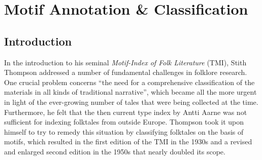
\chapter{Motif Annotation \& Classification}\label{ch:motif-classification}


\section{Introduction}

In the introduction to his seminal \emph{Motif-Index of Folk Literature} (TMI), Stith Thompson addressed a number of fundamental challenges in folklore research. One crucial problem concerns ``the need for a comprehensive classification of the materials in all kinds of traditional narrative''\autocite[8]{thompson:1955}, which became all the more urgent in light of the ever-growing number of tales that were being collected at the time. Furthermore, he felt that the then current type index by Antti Aarne\autocite{aarne:1928} was not sufficient for indexing folktales from outside Europe. Thompson took it upon himself to try to remedy this situation by classifying folktales on the basis of motifs, which resulted in the first edition of the TMI in the 1930s\autocite{thompson:1932} and a revised and enlarged second edition in the 1950s that nearly doubled its scope\autocite{thompson:1955}.

